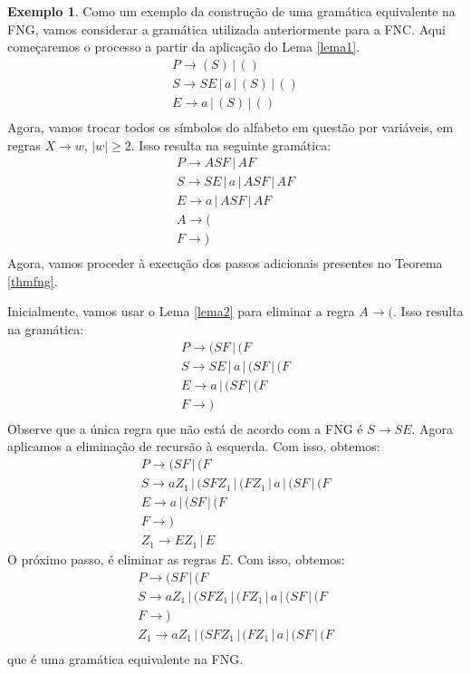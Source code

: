 \documentclass[a4paper]{article}
\theoremstyle{definition}
\newtheorem{Example}{Exemplo}
\begin{document}
  \begin{Example}
    Como um exemplo da construção de uma gramática equivalente na FNG, vamos
    considerar a gramática utilizada anteriormente para a FNC. Aqui começaremos
    o processo a partir da aplicação do Lema \ref{lema1}.
    \[
      \begin{array}{l}
        P \to (S) \,|\, ()\\
        S \to SE \,|\, a \,|\, (S)\,|\, ()\\
        E \to a \,|\, (S)\,|\,()\\
      \end{array}
    \]
    Agora, vamos trocar todos os símbolos do alfabeto em questão por variáveis,
    em regras $X \to w$, $|w| \geq 2$. Isso resulta na seguinte gramática:
    \[
      \begin{array}{l}
        P \to ASF \,|\, AF \\
        S \to SE \,|\, a \,|\, ASF\,|\, AF\\
        E \to a \,|\, ASF\,|\,AF\\
        A \to ( \\
        F \to ) \\
      \end{array}
    \]
     Agora, vamos proceder
    à execução dos passos adicionais presentes no Teorema \ref{thmfng}.
    
    Inicialmente, vamos usar o Lema \ref{lema2} para eliminar a regra $A \to ($.
    Isso resulta na gramática:
    \[
      \begin{array}{l}
        P \to (SF \,|\, (F \\
        S \to SE \,|\, a \,|\, (SF\,|\, (F\\
        E \to a \,|\, (SF\,|\,(F\\
        F \to ) \\
      \end{array}
    \]
    Observe que a única regra que não está de acordo com a FNG é $S \to SE$.
    Agora aplicamos a eliminação de recursão à esquerda. Com isso, obtemos:
    \[
      \begin{array}{l}
        P \to (SF \,|\, (F \\
        S \to aZ_1\,|\, (SFZ_1 \,|\, (FZ_1\,|\, a \,|\, (SF\,|\, (F\\
        E \to a \,|\, (SF\,|\,(F\\
        F \to ) \\
        Z_1 \to EZ_1 \,|\, E
      \end{array}
    \]
    O próximo passo, é eliminar as regras $E$. Com isso, obtemos:
    \[
      \begin{array}{l}
        P \to (SF \,|\, (F \\
        S \to aZ_1\,|\, (SFZ_1 \,|\, (FZ_1\,|\, a \,|\, (SF\,|\, (F\\
        F \to ) \\
        Z_1 \to aZ_1 \,|\, (SFZ_1 \,|\, (FZ_1\,|\, a\,|\,(SF \,|\, (F\\
      \end{array}
    \]
    que é uma gramática equivalente na FNG.
  \end{Example}
\end{document}
